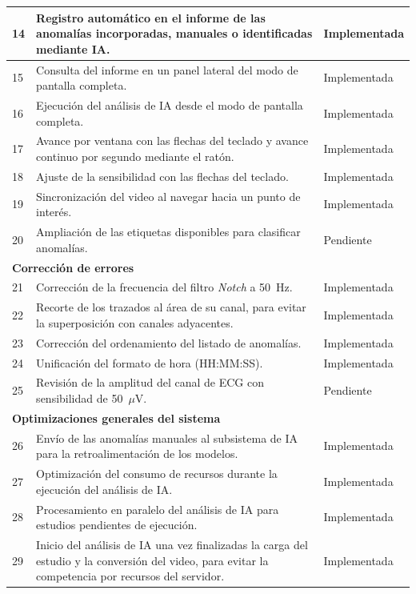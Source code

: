 \begin{longtable}{|p{0.8cm}|p{9.6cm}|p{2.6cm}|}
\hline
14 & Registro automático en el informe de las anomalías incorporadas, manuales o identificadas mediante IA. & Implementada \\
\hline
15 & Consulta del informe en un panel lateral del modo de pantalla completa. & Implementada \\
\hline
16 & Ejecución del análisis de IA desde el modo de pantalla completa. & Implementada \\
\hline
17 & Avance por ventana con las flechas del teclado y avance continuo por segundo mediante el ratón. & Implementada \\
\hline
18 & Ajuste de la sensibilidad con las flechas del teclado. & Implementada \\
\hline
19 & Sincronización del video al navegar hacia un punto de interés. & Implementada \\
\hline
20 & Ampliación de las etiquetas disponibles para clasificar anomalías. & Pendiente \\
\hline
\multicolumn{3}{|l|}{\textbf{Corrección de errores}} \\
\hline
21 & Corrección de la frecuencia del filtro \textit{Notch} a 50~Hz. & Implementada \\
\hline
22 & Recorte de los trazados al área de su canal, para evitar la superposición con canales adyacentes. & Implementada \\
\hline
23 & Corrección del ordenamiento del listado de anomalías. & Implementada \\
\hline
24 & Unificación del formato de hora (HH:MM:SS). & Implementada \\
\hline
25 & Revisión de la amplitud del canal de ECG con sensibilidad de 50~$\mu$V. & Pendiente \\
\hline
\multicolumn{3}{|l|}{\textbf{Optimizaciones generales del sistema}} \\
\hline
26 & Envío de las anomalías manuales al subsistema de IA para la retroalimentación de los modelos. & Implementada \\
\hline
27 & Optimización del consumo de recursos durante la ejecución del análisis de IA. & Implementada \\
\hline
28 & Procesamiento en paralelo del análisis de IA para estudios pendientes de ejecución. & Implementada \\
\hline
29 & Inicio del análisis de IA una vez finalizadas la carga del estudio y la conversión del video, para evitar la competencia por recursos del servidor. & Implementada \\
\hline
\end{longtable}
\endgroup

